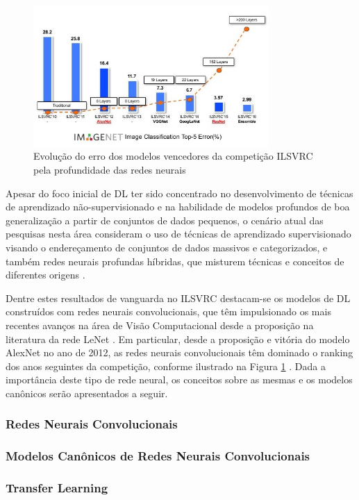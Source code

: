 \begin{figure}[ht]
	\centering
	\caption{Evolução do erro dos modelos vencedores da competição ILSVRC pela profundidade das redes neurais \cite{dl_ILSVRC, ImagenetChall}}
	\label{fig:compara_redes_ilsvrc}
	\includegraphics[width=0.8\textwidth]{img/compara_redes_ilsvrc.png}
\end{figure}

Apesar do foco inicial de DL ter sido concentrado no desenvolvimento de técnicas de aprendizado não-supervisionado e na habilidade de modelos profundos de boa generalização a partir de conjuntos de dados pequenos, o cenário atual das pesquisas nesta área consideram o uso de técnicas de aprendizado supervisionado visando o endereçamento de conjuntos de dados massivos e categorizados, e também redes neurais profundas híbridas, que misturem técnicas e conceitos de diferentes origens \cite{deng2014deep,goodfellow2016deep}.

Dentre estes resultados de vanguarda no ILSVRC destacam-se os modelos de DL construídos com redes neurais convolucionais, que têm impulsionado os mais recentes avanços na área de Visão Computacional desde a proposição na literatura da rede LeNet \cite{lenet}. Em particular, desde a proposição e vitória do modelo AlexNet \cite{alexnet} no ano de 2012, as redes neurais convolucionais têm dominado o ranking dos anos seguintes da competição, conforme ilustrado na Figura \ref{fig:compara_redes_ilsvrc} \cite{deng2014deep}. Dada a importância deste tipo de rede neural, os conceitos sobre as mesmas e os modelos canônicos serão apresentados a seguir.


\subsubsection{Redes Neurais Convolucionais} \label{subsubsec:rnc}


\subsubsection{Modelos Canônicos de Redes Neurais Convolucionais} \label{subsubsec:modelos_canonicos}


\subsubsection{Transfer Learning}

